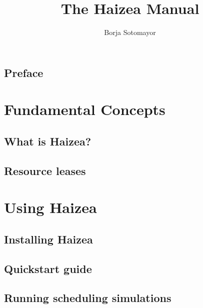 \documentclass[11pt,oneside]{scrbook}
\begin{document}
\frontmatter
\title{The Haizea Manual}
\author{Borja Sotomayor}

\begin{latexonly}

\end{latexonly}
\begin{htmlonly}
\maketitle
\end{htmlonly}

\tableofcontents

\chapter{Preface}


\mainmatter

\part{Fundamental Concepts}

\chapter{What is Haizea?}
\label{chap:whatis}



\chapter{Resource leases}
\label{chap:leases}


\part{Using Haizea}

\chapter{Installing Haizea}



\chapter{Quickstart guide}
\label{chap:quickstart}


\chapter{Running scheduling simulations}
\end{document}
